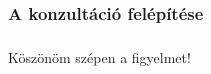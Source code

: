 \documentclass[xcolor={table}]{beamer}
\institute{Mechatronika szakosztály}
\begin{document}
\frame{\titlepage}

\begin{frame}
  \frametitle{A konzultáció felépítése}
  \framesubtitle{\;}
  \tableofcontents
\end{frame}






\begin{frame}
  \frametitle{\;}
  \framesubtitle{\;}

  \centering
  \LARGE
  Köszönöm szépen a figyelmet!
\end{frame}
\end{document}
